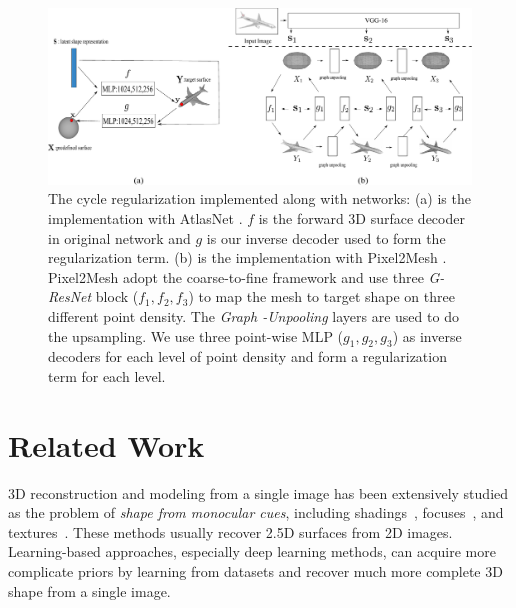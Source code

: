 \begin{figure}[t]
	\centering
	\includegraphics[width=\linewidth]{img/net/net}
	\caption{The cycle regularization implemented along with networks: (a) is the implementation with AtlasNet \cite{atlasnet}. $f$ is the forward 3D surface decoder in original network and $g$ is our inverse decoder used to form the regularization term. (b) is the implementation with Pixel2Mesh \cite{pixel2mesh}.  Pixel2Mesh \cite{pixel2mesh} adopt the coarse-to-fine framework and use three \emph{G-ResNet} block ($f_1,f_2,f_3$) to map the mesh to target shape on three different point density. The \emph{Graph -Unpooling} layers are used to do the upsampling. We use three point-wise MLP ($g_1,g_2,g_3$) as inverse decoders for each level of point density and form a regularization term for each level.}
	\label{fig:net}
\end{figure}

\section{Related Work}
3D reconstruction and modeling from a single image has been extensively studied as the problem of \emph{shape from monocular cues}, including shadings~\cite{shapefromshadingsurvey}, focuses~\cite{shapefromdf1,shapefromdf2}, and textures~\cite{Aloimonos1988}. 
These methods usually recover 2.5D surfaces from 2D images. 
Learning-based approaches, especially deep learning methods, can acquire more complicate priors by learning from datasets and recover much more complete 3D shape from a single image.
 
